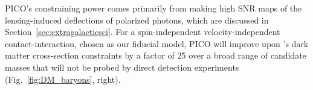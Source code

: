 \documentclass[PICOReport.tex]{subfiles}
\begin{document}
PICO's constraining power comes primarily from making high \ac{SNR} maps of the lensing-induced deflections of polarized photons, which are discussed in Section~\ref{sec:extragalacticsci}.  For a spin-independent velocity-independent contact-interaction, chosen as our fiducial model, PICO will improve upon \planck 's dark matter cross-section constraints by a factor of 25 over a broad range of candidate masses that will not be probed by direct detection experiments (Fig.~\ref{fig:DM_baryons}, right). 

%
\end{document}
